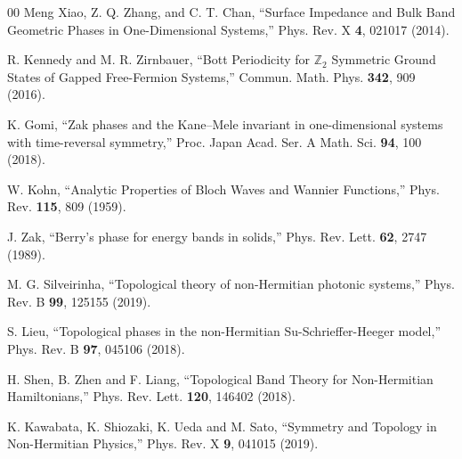 \documentclass[preprint,12pt]{elsarticle}
\def\bbZ{\mathbb Z}
\begin{document}
\begin{thebibliography}{00}
  Meng Xiao, Z. Q. Zhang, and C. T. Chan, ``Surface Impedance and Bulk Band Geometric Phases in One-Dimensional Systems,'' Phys. Rev. X {\bf 4}, 021017 (2014).

 R. Kennedy and M. R. Zirnbauer, ``Bott Periodicity for $\bbZ_2$ Symmetric Ground States of Gapped Free-Fermion Systems,'' Commun. Math. Phys.{ \bf 342}, 909 (2016).

 K. Gomi, ``Zak phases and the Kane--Mele invariant in one-dimensional systems with time-reversal symmetry,''
Proc. Japan Acad. Ser. A Math. Sci. {\bf 94}, 100 (2018).

 W. Kohn, ``Analytic Properties of Bloch Waves and Wannier Functions,'' Phys. Rev. {\bf 115}, 809 (1959).

 J. Zak, ``Berry's phase for energy bands in solids,'' Phys. Rev. Lett. {\bf 62}, 2747 (1989).

 M. G. Silveirinha, ``Topological theory of non-Hermitian photonic systems,'' Phys. Rev. B {\bf 99}, 125155 (2019).

 S. Lieu, ``Topological phases in the non-Hermitian Su-Schrieffer-Heeger model,'' Phys. Rev. B {\bf 97}, 045106 (2018).

 H. Shen, B. Zhen and F. Liang, ``Topological Band Theory for Non-Hermitian Hamiltonians,'' Phys. Rev. Lett. {\bf 120}, 146402 (2018).

 K. Kawabata, K. Shiozaki, K. Ueda and M. Sato, ``Symmetry and Topology in Non-Hermitian Physics,'' Phys. Rev. X {\bf 9}, 041015 (2019).

\end{thebibliography}
\end{document}
